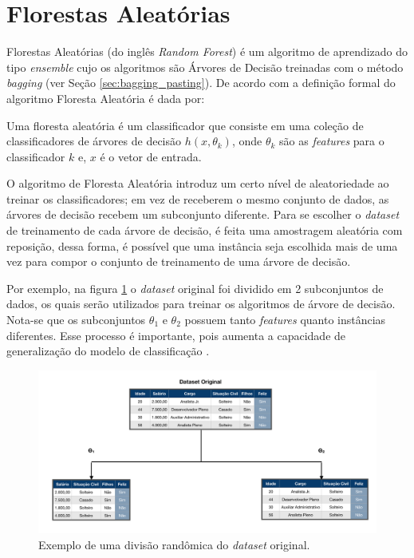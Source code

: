 \section{Florestas Aleatórias}
\label{sec:floresta}

Florestas Aleatórias (do inglês \textit{Random Forest}) é um algoritmo de aprendizado do tipo \textit{ensemble} cujo os algoritmos são Árvores de Decisão \cite{Quinlan:1986} treinadas com o método \textit{bagging} (ver Seção \ref{sec:bagging_pasting}).
De acordo com \cite{breiman:2001} a definição formal do algoritmo Floresta Aleatória é dada por:

\begin{definition}\label{def:floresta}
Uma floresta aleatória é um classificador que consiste em uma coleção de classificadores de árvores de decisão ${h(x, \theta _k)}$, onde ${\theta _k}$ são as \textit{features} para o classificador $k$ e, $x$ é o vetor de entrada.
\end{definition}

O algoritmo de Floresta Aleatória introduz um certo nível de aleatoriedade ao treinar os classificadores; em vez de receberem o mesmo conjunto de dados, as árvores de decisão recebem um subconjunto diferente. Para se escolher o \textit{dataset} de treinamento de cada árvore de decisão, é feita uma amostragem aleatória com reposição, dessa forma, é possível que uma instância seja escolhida mais de uma vez para compor o conjunto de treinamento de uma árvore de decisão. 

Por exemplo, na figura \ref{fig:split_floresta} o \textit{dataset} original foi dividido em 2 subconjuntos de dados, os quais serão utilizados para treinar os algoritmos de árvore de decisão. Nota-se que os subconjuntos $\theta_1$ e $\theta_2$ possuem tanto \textit{features} quanto instâncias diferentes. Esse processo é importante, pois aumenta a capacidade de generalização do modelo de classificação \cite{breiman:2001}.

\begin{figure}[h!]
    \centering
    \includegraphics[scale=0.4]{Imagens/split_RandomForest.png}
    \caption{Exemplo de uma divisão randômica do \textit{dataset} original.}
    \label{fig:split_floresta}
\end{figure}


